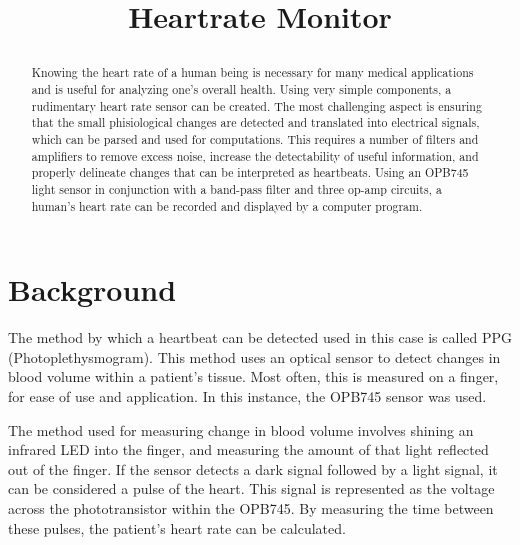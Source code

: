 \documentclass[conference]{IEEEtran}
\begin{document}
\title{Heartrate Monitor\\

\author{
\and
{}
}
}

\maketitle

\begin{abstract}
Knowing the heart rate of a human being is
necessary for many medical applications and is useful for analyzing
one's overall health. Using very simple components, a rudimentary
heart rate sensor can be created. The most challenging aspect is ensuring
that the small phisiological changes are detected and translated into
electrical signals, which can be parsed and used for computations. This
requires a number of filters and amplifiers to remove excess noise,
increase the detectability of useful information, and properly delineate
changes that can be interpreted as heartbeats. Using an OPB745 light sensor in conjunction
with a band-pass filter and three op-amp circuits, a human's heart rate
can be recorded and displayed by a computer program.
\end{abstract}

\section{Background}
    The method by which a heartbeat can be detected used in this case is called PPG
    (Photoplethysmogram). This method uses an optical sensor to detect
    changes in blood volume within a patient's tissue. Most often, this is
    measured on a finger, for ease of use and application. In this instance,
    the OPB745 sensor was used. 
    
    The method used for measuring change in blood 
    volume involves shining an infrared LED into the finger, and measuring the
    amount of that light reflected out of the finger. If the sensor
    detects a dark signal followed by a light signal, it can be considered a
    pulse of the heart. This signal is represented as
    the voltage across the phototransistor within the OPB745. By measuring the time between
    these pulses, the patient's heart rate can be calculated. 
    
\end{document}
